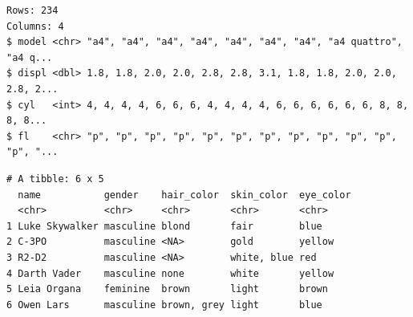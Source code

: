 \documentclass[
  11pt,
]{krantz}
\newenvironment{Shaded}{\begin{snugshade}}{\end{snugshade}}
\newcommand{\CommentTok}[1]{\textcolor[rgb]{0.37,0.37,0.37}{\textit{#1}}}
\newcommand{\KeywordTok}[1]{\textcolor[rgb]{0.27,0.27,0.27}{\textbf{#1}}}
\newcommand{\NormalTok}[1]{#1}
\newcommand{\OperatorTok}[1]{\textcolor[rgb]{0.43,0.43,0.43}{\textbf{#1}}}
\newcommand{\StringTok}[1]{\textcolor[rgb]{0.5,0.5,0.5}{#1}}
\begin{document}
\begin{Shaded}
\end{Shaded}

\begin{verbatim}
Rows: 234
Columns: 4
$ model <chr> "a4", "a4", "a4", "a4", "a4", "a4", "a4", "a4 quattro", "a4 q...
$ displ <dbl> 1.8, 1.8, 2.0, 2.0, 2.8, 2.8, 3.1, 1.8, 1.8, 2.0, 2.0, 2.8, 2...
$ cyl   <int> 4, 4, 4, 4, 6, 6, 6, 4, 4, 4, 4, 6, 6, 6, 6, 6, 6, 8, 8, 8, 8...
$ fl    <chr> "p", "p", "p", "p", "p", "p", "p", "p", "p", "p", "p", "p", "...
\end{verbatim}

\begin{Shaded}
\end{Shaded}

\begin{verbatim}
# A tibble: 6 x 5
  name           gender    hair_color  skin_color  eye_color
  <chr>          <chr>     <chr>       <chr>       <chr>    
1 Luke Skywalker masculine blond       fair        blue     
2 C-3PO          masculine <NA>        gold        yellow   
3 R2-D2          masculine <NA>        white, blue red      
4 Darth Vader    masculine none        white       yellow   
5 Leia Organa    feminine  brown       light       brown    
6 Owen Lars      masculine brown, grey light       blue     
\end{verbatim}

\begin{Shaded}
\end{Shaded}
\end{document}
